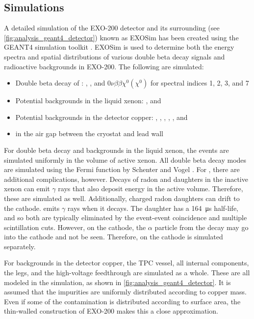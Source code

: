 \documentclass[herrin-thesis.tex]{subfiles}
\begin{document}
\subsection{Simulations}
\label{sec:analysis_simulations} 
A detailed simulation of the EXO-200 detector and its surrounding (see \cref{fig:analysis_geant4_detector}) known as EXOSim has been created using the GEANT4 simulation toolkit \cite{Agostinelli:2003fk}. EXOSim is used to determine both the energy spectra and spatial distributions of various double beta decay signals and radioactive backgrounds in EXO-200. The following are simulated:
\begin{itemize}
\item Double beta decay of :
	\twonu{},
	\zeronu{},
	and \(0\nu\beta\beta\chi^{0}(\chi^{0})\) for spectral indices 1, 2, 3, and 7
\item Potential backgrounds in the liquid xenon:
	,
	and 
\item Potential backgrounds in the detector copper:
	, 
	,
	,
	,
	,
	and 
\item {} in the air gap between the cryostat and lead wall
\end{itemize}

For double beta decay and backgrounds in the liquid xenon, the events are simulated uniformly in the volume of active xenon. All double beta decay modes are simulated using the Fermi function by Schenter and Vogel \cite{Schenter:1983uq}. For , there are additional complications, however. Decays of radon and daughters in the inactive xenon can emit \(\gamma\) rays that also deposit energy in the active volume. Therefore, these are simulated as well. Additionally, charged radon daughters can drift to the cathode.  emits \(\gamma\) rays when it decays. The daughter  has a \SI{164}{\micro\s} half-life, and so both are typically eliminated by the event-event coincidence and multiple scintillation cuts. However, on the cathode, the \(\alpha\) particle from the  decay may go into the cathode and not be seen. Therefore,  on the cathode is simulated separately.

For backgrounds in the detector copper, the TPC vessel, all internal components, the legs, and the high-voltage feedthrough are simulated as a whole. These are all modeled in the simulation, as shown in \cref{fig:analysis_geant4_detector}. It is assumed that the impurities are uniformly distributed according to copper mass. Even if some of the contamination is distributed according to surface area, the thin-walled construction of EXO-200 makes this a close approximation.
\end{document}
